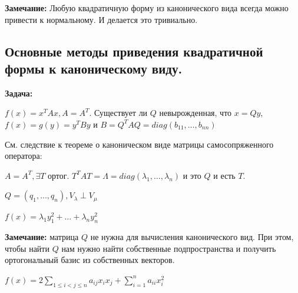 \textbf{Замечание:} Любую квадратичную форму из канонического вида всегда можно привести к нормальному. И делается это тривиально.

\newpage

\subsection{Основные методы приведения квадратичной формы к каноническому виду.}

\textbf{Задача:} 

$f(x) = x^T Ax,A = A^T$. Существует ли $Q$ невырожденная, что $x = Qy$, $f(x) = g(y) = y^TBy$ и $B = Q^TAQ = diag(b_{11},\ldots, b_{nn})$



См. следствие к теореме о каноническом виде матрицы самосопряженного оператора:

$A = A^T, \exists T$ ортог. $T^T  A T = \Lambda = diag(\lambda_1,\ldots,\lambda_n)$ и это $Q$ и есть $T$.

$Q = (q_1,\ldots,q_n), V_\lambda \perp V_\mu$

$f(x) = \lambda_1 y_1^2 + \ldots + \lambda_n y_n^2$

\textbf{Замечание:} матрица $Q$ не нужна для вычисления канонического вид. При этом, чтобы найти $Q$ нам нужно найти собственные подпространства и получить ортогональный базис из собственных векторов.


$f(x) = 2 \sum\limits_{1 \leq i <j \leq n}a_{ij}x_i x_j + \sum\limits_{i=1}^n a_{ii}x_i^2$

